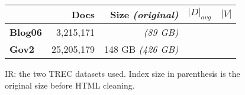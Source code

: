 \begin{figure}
\centering
{\small
\begin{tabular}{|l|r|r|r|r|}
    \hline & \textbf{Docs} & \textbf{Size} \emph{(original)} & \textbf{$|D|_{avg}$} &
    \textbf{$|V|$} \\
    \hline
    \textbf{Blog06} & 3,215,171 & \emph{(89 GB)} & & \\
    \textbf{Gov2} & 25,205,179 & 148 GB \emph{(426 GB)} & & \\
    \hline
\end{tabular}
\caption{IR: the two TREC datasets used. Index size in parenthesis is the
original size before HTML cleaning.}
}
\label{fig:ir-datasets}
\end{figure}
